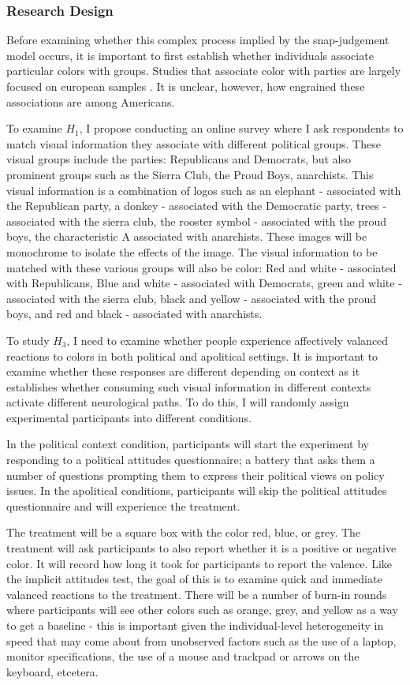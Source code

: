 \documentclass [12pt]{article}
\begin{document}
        \subsubsection*{Research Design}
Before examining whether this complex process implied by the snap-judgement model occurs, it is important to first establish whether individuals associate particular colors with groups. Studies that associate color with parties are largely focused on european samples \citep[see][]{casiraghi_et-al_2022_pp,maestre_medero_2022_pr}. It is unclear, however, how engrained these associations are among Americans. 

To examine $H_1$, I propose conducting an online survey where I ask respondents to match visual information they associate with different political groups. These visual groups include the parties: Republicans and Democrats, but also prominent groups such as the Sierra Club, the Proud Boys, anarchists. This visual information is a combination of logos such as an elephant - associated with the Republican party, a donkey - associated with the Democratic party, trees - associated with the sierra club, the rooster symbol - associated with the proud boys, the characteristic A associated with anarchists. These images will be monochrome to isolate the effects of the image. The visual information to be matched with these various groups will also be color: Red and white - associated with Republicans, Blue and white - associated with Democrats, green and white - associated with the sierra club, black and yellow - associated with the proud boys, and red and black - associated with anarchists.

To study $H_3$, I need to examine whether people experience affectively valanced reactions to colors in both political and apolitical settings. It is important to examine whether these responses are different depending on context as it establishes whether consuming such visual information in different contexts activate different neurological paths. To do this, I will randomly assign experimental participants into different conditions. 

In the political context condition, participants will start the experiment by responding to a political attitudes questionnaire; a battery that asks them a number of questions prompting them to express their political views on policy issues. In the apolitical conditions, participants will skip the political attitudes questionnaire and will experience the treatment. 

The treatment will be a square box with the color red, blue, or grey. The treatment will ask participants to also report whether it is a positive or negative color. It will record how long it took for participants to report the valence. Like the implicit attitudes test, the goal of this is to examine quick and immediate valanced reactions to the treatment. There will be a number of burn-in rounds where participants will see other colors such as orange, grey, and yellow as a way to get a baseline - this is important given the individual-level heterogeneity in speed that may come about from unobserved factors such as the use of a laptop, monitor specifications, the use of a mouse and trackpad or arrows on the keyboard, etcetera. 
\end{document}
